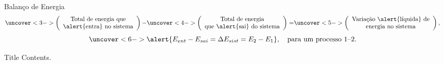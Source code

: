     \begin{frame}{Balanço de Energia}\vspace*{-2em}
        \\[\medskipamount]
        \begin{equation*}%
            \uncover<3->{\left(\begin{array}{c}
                \text{Total de energia que} \\
                \text{\alert{entra} no sistema}
            \end{array}\right)-}
            \uncover<4->{\left(\begin{array}{c}
                \text{Total de energia} \\
                \text{que \alert{sai} do sistema}
            \end{array}\right)=}
            \uncover<5->{\left(\begin{array}{c}
                \text{Variação \alert{líquida} de} \\
                \text{energia no sistema}
            \end{array}\right),}%
        \end{equation*}%
        \begin{equation*}%
            \uncover<6->{\alert{E_{ent} - E_{sai} = \Delta{E}_{sist} = E_2 -
            E_1},\quad\mbox{para um processo $1$--$2$.}}%
        \end{equation*}%
    \end{frame}

    \begin{frame}{Title}\vspace*{-2em}
        Contents.
    \end{frame}

